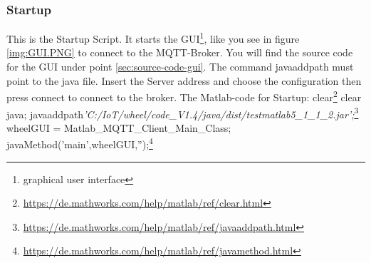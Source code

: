 \documentclass[12pt]{article}
\begin{document}
\subsubsection{Startup}
This is the Startup Script. It starts the GUI\footnote{graphical user interface}, like you see in figure \ref{img:GUI.PNG} to connect to the MQTT-Broker. You will find the source code for the GUI under point \ref{sec:source-code-gui}.
The command javaaddpath must point to the java file.
Insert the Server address and choose the configuration then press connect to connect to the broker.
The Matlab-code for Startup:
\lstset{basicstyle=\small,
	breaklines=true,
	language=java,
	showspaces=false,
	showtabs=false}
\newline
clear\footnote{\url{https://de.mathworks.com/help/matlab/ref/clear.html}}
\newline
{}
\newline
clear java;
\newline
{}
\newline
javaaddpath\textit{'C:/IoT/wheel/code\_V1.4/java/dist/testmatlab5\_1\_1\_2.jar';}\footnote{\url{https://de.mathworks.com/help/matlab/ref/javaaddpath.html}}\newline
{}
\newline
wheelGUI = Matlab\_MQTT\_Client\_Main\_Class;
\newline
{}
\newline
javaMethod('main',wheelGUI,'');\footnote{\url{https://de.mathworks.com/help/matlab/ref/javamethod.html}}
\newline
{}
\end{document}
